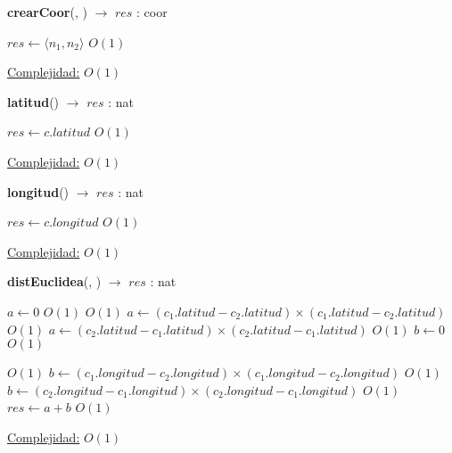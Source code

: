 \begin{Algoritmos}
   
\begin{algorithm}[H]{\textbf{crearCoor}(, ) $\to$ $res$ : coor}
    	\begin{algorithmic}[1]
			 \State $res \gets  \langle n_1 , n_2 \rangle $ \Comment $O(1)$

			\medskip
			\Statex \underline{Complejidad:} $O(1)$
    	\end{algorithmic}
\end{algorithm}
   
\begin{algorithm}[H]{\textbf{latitud}() $\to$ $res$ : nat}
    	\begin{algorithmic}[1]
			 \State $res \gets  c.latitud $ \Comment $O(1)$

			\medskip
			\Statex \underline{Complejidad:} $O(1)$
    	\end{algorithmic}
\end{algorithm}


\begin{algorithm}[H]{\textbf{longitud}() $\to$ $res$ : nat}
    	\begin{algorithmic}[1]
			 \State $res \gets  c.longitud $ \Comment $O(1)$

			\medskip
			\Statex \underline{Complejidad:} $O(1)$
    	\end{algorithmic}
\end{algorithm}

\begin{algorithm}[H]{\textbf{distEuclidea}(, ) $\to$ $res$ : nat}
    	\begin{algorithmic}[1]
    		 \State $a \gets 0$ \Comment $O(1)$
    		 	\Comment $O(1)$
				\State $a \gets (c_1.latitud - c_2.latitud) \times (c_1.latitud - c_2.latitud)$ \Comment $O(1)$	
			\Else 
				\State $a \gets (c_2.latitud - c_1.latitud) \times (c_2.latitud - c_1.latitud)$ \Comment $O(1)$	
			\EndIf
			\State $b \gets 0$ \Comment $O(1)$

				\Comment $O(1)$
				\State $b \gets (c_1.longitud - c_2.longitud) \times (c_1.longitud - c_2.longitud)$ \Comment $O(1)$	
			\Else 
				\State $b \gets (c_2.longitud - c_1.longitud) \times (c_2.longitud - c_1.longitud)$ \Comment $O(1)$	
			\EndIf
			\State $res \gets  a + b$ \Comment $O(1)$

			\medskip
			\Statex \underline{Complejidad:} $O(1)$
    	\end{algorithmic}
\end{algorithm}

\end{Algoritmos}
